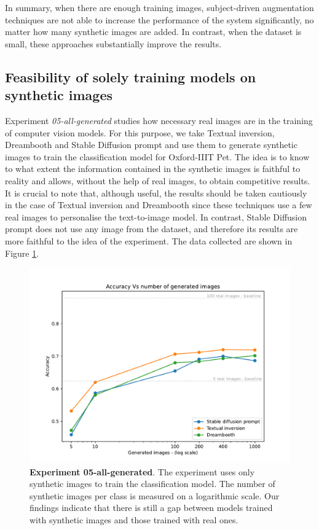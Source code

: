 In summary, when there are enough training images, subject-driven augmentation techniques are not able to increase the performance of the system significantly, no matter how many synthetic images are added. In contrast, when the dataset is small, these approaches substantially improve the results.

\subsection{Feasibility of solely training models on synthetic images} \label{sec: exp-05}

Experiment \textit{05-all-generated} studies how necessary real images are in the training of computer vision models. For this purpose, we take Textual inversion, Dreambooth and Stable Diffusion prompt and use them to generate synthetic images to train the classification model for Oxford-IIIT Pet. The idea is to know to what extent the information contained in the synthetic images is faithful to reality and allows, without the help of real images, to obtain competitive results. It is crucial to note that, although useful, the results should be taken cautiously in the case of Textual inversion and Dreambooth since these techniques use a few real images to personalise the text-to-image model. In contrast, Stable Diffusion prompt does not use any image from the dataset, and therefore its results are more faithful to the idea of the experiment. The data collected are shown in Figure \ref{fig:exp5}.

\begin{figure}[ht]
    \centering
    \includegraphics[width=1\textwidth]{Pictures/experiment_005.pdf}
    \caption{\textbf{Experiment 05-all-generated}. The experiment uses only synthetic images to train the classification model. The number of synthetic images per class is measured on a logarithmic scale. Our findings indicate that there is still a gap between models trained with synthetic images and those trained with real ones.}
    \label{fig:exp5}
\end{figure}

